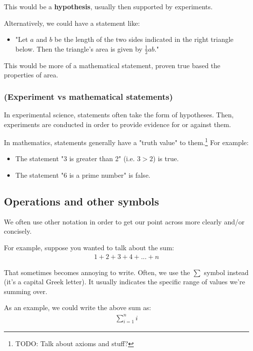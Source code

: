 This would be a \textbf{hypothesis}, usually then supported by experiments. 

Alternatively, we could have a statement like:

\begin{itemize}
\item "Let $a$ and $b$ be the length of the two sides indicated in the right triangle below. Then the triangle's area is given by $\frac{1}{2}ab$."
\end{itemize}

This would be more of a mathematical statement, proven true based the properties of area.

\subsubsection{(Experiment vs mathematical statements)}

In experimental science, statements often take the form of hypotheses. Then, experiments are conducted in order to provide evidence for or against them.

In mathematics, statements generally have a "truth value" to them.\footnote{TODO: Talk about axioms and stuff?} For example:

\begin{itemize}
\item The statement "3 is greater than 2" (i.e. $3 > 2$) is true. 
\item The statement "6 is a prime number" is false. 
\end{itemize}


\subsection{Operations and other symbols}

We often use other notation in order to get our point across more clearly and/or concisely. 

For example, suppose you wanted to talk about the sum:
\begin{align*}
1 + 2 + 3 + 4 + ... + n
\end{align*}

That sometimes becomes annoying to write. Often, we use the $\sum$ symbol instead (it's a capital Greek letter). It usually indicates the specific range of values we're summing over. %

As an example, we could write the above sum as:
\begin{align*}
\sum_{i=1}^n i
\end{align*}

